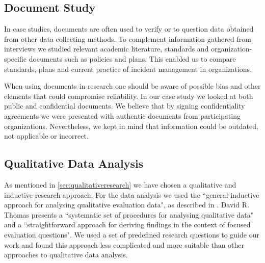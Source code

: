 

\subsection{Document Study}
\label{sec:documentStudy}
In case studies, documents are often used to verify or to question data obtained from other data collecting methods. To complement information gathered from interviews we studied relevant academic literature, standards and organization-specific documents such as policies and plans. This enabled us to compare standards, plans and current practice of incident management in organizations.

When using documents in research one should be aware of possible bias and other elements that could compromise reliability\cite{oates2005researching}. In our case study we looked at both public and confidential documents.  We believe that by signing confidentiality agreements we were presented with authentic documents from participating organizations. Nevertheless, we kept in mind that information could be outdated, not applicable or incorrect.      


\subsection{Qualitative Data Analysis}
\label{sec:qualitativeAnalysis}
As mentioned in \ref{sec:qualitativeresearch} we have chosen a qualitative and inductive research approach. For the data analysis we used the ``general inductive approach for analysing qualitative evaluation data", as described in \cite{thomas2006general}. David R. Thomas presents a ``systematic set of procedures for analysing qualitative data" and a ``straightforward approach for deriving findings in the context of focused evaluation questions". We used a set of predefined research questions to guide our work and found this approach less complicated and more suitable than other approaches to qualitative data analysis.

